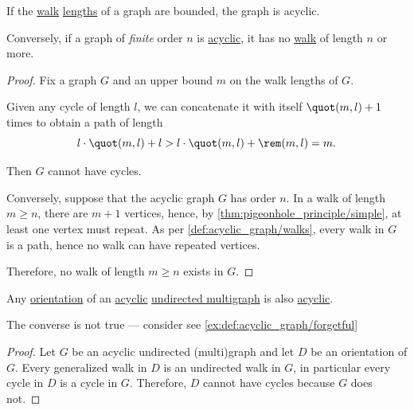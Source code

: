 \begin{proposition}\label{thm:acyclic_graph_walk_length}
  If the \hyperref[def:graph_walk]{walk} \hyperref[def:graph_walk/length]{lengths} of a graph are bounded, the graph is acyclic.

  Conversely, if a graph of \emph{finite} order \( n \) is \hyperref[def:acyclic_graph]{acyclic}, it has no \hyperref[def:graph_walk]{walk} of length \( n \) or more.
\end{proposition}
\begin{proof}
  \SufficiencySubProof Fix a graph \( G \) and an upper bound \( m \) on the walk lengths of \( G \).

  Given any cycle of length \( l \), we can concatenate it with itself \( \quot(m, l) + 1 \) times to obtain a path of length
  \begin{equation*}
    l \cdot \quot(m, l) + l > l \cdot \quot(m, l) + \rem(m, l) = m.
  \end{equation*}

  Then \( G \) cannot have cycles.

  \NecessitySubProof Conversely, suppose that the acyclic graph \( G \) has order \( n \). In a walk of length \( m \geq n \), there are \( m + 1 \) vertices, hence, by \cref{thm:pigeonhole_principle/simple}, at least one vertex must repeat. As per \cref{def:acyclic_graph/walks}, every walk in \( G \) is a path, hence no walk can have repeated vertices.

  Therefore, no walk of length \( m \geq n \) exists in \( G \).
\end{proof}

\begin{proposition}\label{thm:acyclic_undirected_graph_orientation}
  Any \hyperref[def:multigraph_orientation]{orientation} of an \hyperref[def:acyclic_graph]{acyclic} \hyperref[def:hypergraph/multigraph]{undirected multigraph} is also \hyperref[def:acyclic_graph]{acyclic}.
\end{proposition}
\begin{comments}
  \item The converse is not true --- consider see \cref{ex:def:acyclic_graph/forgetful}
\end{comments}
\begin{proof}
  Let \( G \) be an acyclic undirected (multi)graph and let \( D \) be an orientation of \( G \). Every generalized walk in \( D \) is an undirected walk in \( G \), in particular every cycle in \( D \) is a cycle in \( G \). Therefore, \( D \) cannot have cycles because \( G \) does not.
\end{proof}


